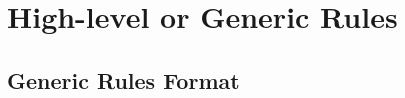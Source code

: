 \section{\label{sec:cps:highlevelrules}High-level or Generic Rules}

\subsection{\label{sec:cps:genericrules}Generic Rules Format}




